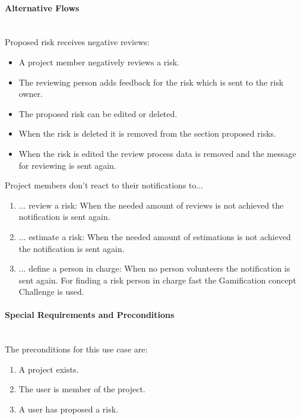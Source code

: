 \paragraph*{Alternative Flows}\mbox{}\\

\noindent
Proposed risk receives negative reviews:
\begin{itemize}
	\vspace{-3mm}
	\setlength\itemsep{-1em}
	
	\item A project member negatively reviews a risk.
	\item The reviewing person adds feedback for the risk which is sent to the risk owner.
	\item The proposed risk can be edited or deleted.
	\item When the risk is deleted it is removed from the section proposed risks.
	\item When the risk is edited the review process data is removed and the message for reviewing is sent again.
\end{itemize}

\noindent
Project members don't react to their notifications to...
\begin{enumerate}
	\vspace{-3mm}
	\setlength\itemsep{-1em}
	
	\item ... review a risk: When the needed amount of reviews is not achieved the notification is sent again.
	\item ... estimate a risk: When the needed amount of estimations is not achieved the notification is sent again.
	\item ... define a person in charge: When no person volunteers the notification is sent again. For finding a risk person in charge fast the Gamification concept Challenge is used.
\end{enumerate}

\paragraph*{Special Requirements and Preconditions}\mbox{}\\
The preconditions for this use case are:
\begin{enumerate}
	\vspace{-3mm}
	\setlength\itemsep{-1em}	
	\item  A project exists.
	\item The user is member of the project.
	\item A user has proposed a risk.
\end{enumerate}

